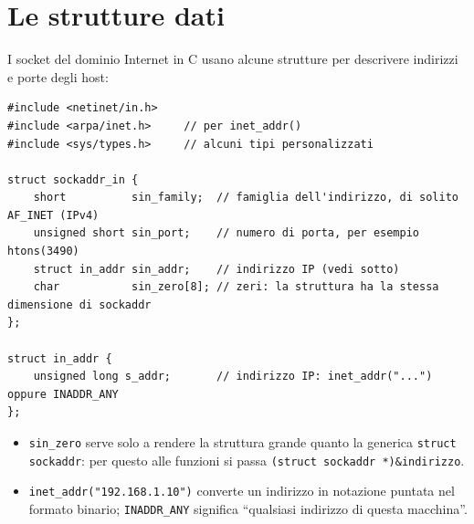 \section{Le strutture dati}

I socket del dominio Internet in C usano alcune strutture per descrivere indirizzi e porte degli host:

\begin{lstlisting}[language={[POSIX]C}]
#include <netinet/in.h>
#include <arpa/inet.h>     // per inet_addr()
#include <sys/types.h>     // alcuni tipi personalizzati

struct sockaddr_in {
    short          sin_family;  // famiglia dell'indirizzo, di solito AF_INET (IPv4)
    unsigned short sin_port;    // numero di porta, per esempio htons(3490)
    struct in_addr sin_addr;    // indirizzo IP (vedi sotto)
    char           sin_zero[8]; // zeri: la struttura ha la stessa dimensione di sockaddr
};

struct in_addr {
    unsigned long s_addr;       // indirizzo IP: inet_addr("...") oppure INADDR_ANY
};
\end{lstlisting}

\begin{itemize}
    \item \texttt{sin\_zero} serve solo a rendere la struttura grande quanto la generica \texttt{struct sockaddr}:
          per questo alle funzioni si passa \texttt{(struct sockaddr *)\&indirizzo}.
    \item \texttt{inet\_addr("192.168.1.10")} converte un indirizzo in notazione puntata nel formato binario;
          \texttt{INADDR\_ANY} significa ``qualsiasi indirizzo di questa macchina''.
\end{itemize}


